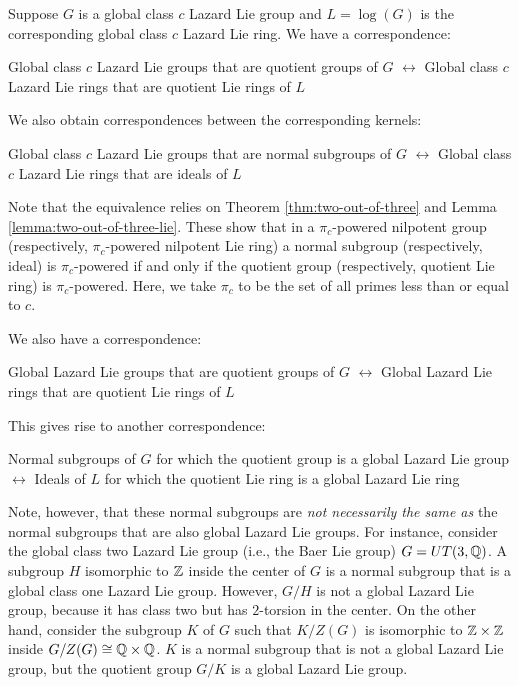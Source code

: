 Suppose $G$ is a global class $c$ Lazard Lie group and $L = \log(G)$
is the corresponding global class $c$ Lazard Lie ring. We have a
correspondence:

\begin{center}
  Global class $c$ Lazard Lie groups that are quotient groups of $G$
  $\leftrightarrow$ Global class $c$ Lazard Lie rings that are
  quotient Lie rings of $L$
\end{center}

We also obtain correspondences between the corresponding kernels:

\begin{center}
  Global class $c$ Lazard Lie groups that are normal subgroups of $G$
  $\leftrightarrow$ Global class $c$ Lazard Lie rings that are ideals
  of $L$
\end{center}

Note that the equivalence relies on Theorem \ref{thm:two-out-of-three}
and Lemma \ref{lemma:two-out-of-three-lie}. These show that in a
$\pi_c$-powered nilpotent group (respectively, $\pi_c$-powered
nilpotent Lie ring) a normal subgroup (respectively, ideal) is
$\pi_c$-powered if and only if the quotient group (respectively,
quotient Lie ring) is $\pi_c$-powered. Here, we take $\pi_c$ to be the
set of all primes less than or equal to $c$.

We also have a correspondence:

\begin{center}
  Global Lazard Lie groups that are quotient groups of $G$
  $\leftrightarrow$ Global Lazard Lie rings that are quotient Lie
  rings of $L$
\end{center}

This gives rise to another correspondence:

\begin{center}
  Normal subgroups of $G$ for which the quotient group is a global
  Lazard Lie group $\leftrightarrow$ Ideals of $L$ for which the
  quotient Lie ring is a global Lazard Lie ring
\end{center}

Note, however, that these normal subgroups are {\em not necessarily
  the same as} the normal subgroups that are also global Lazard Lie
groups. For instance, consider the global class two Lazard Lie group
(i.e., the Baer Lie group) $G = UT(3,\mathbb{Q})$. A subgroup $H$ isomorphic
to $\mathbb{Z}$ inside the center of $G$ is a normal subgroup that is a global
class one Lazard Lie group. However, $G/H$ is not a global Lazard Lie
group, because it has class two but has $2$-torsion in the center. On
the other hand, consider the subgroup $K$ of $G$ such that $K/Z(G)$ is
isomorphic to $\mathbb{Z} \times \mathbb{Z}$ inside $G/Z(G) \cong \mathbb{Q} \times \mathbb{Q}$. $K$
is a normal subgroup that is not a global Lazard Lie group, but the
quotient group $G/K$ is a global Lazard Lie group.

